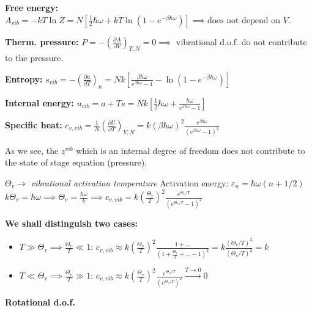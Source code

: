 \documentclass[12pt,a4paper]{report}
\newcommand{\esp}{\vspace{0.5cm}}
\begin{document}
	\esp
	
	\textbf{Free energy:}
	$A_{vib} = -kT \ln Z = N [ \frac{1}{2}\hbar\omega + kT \ln(1 - e^{-\beta\hbar\omega}) ] \implies \text{does not depend on } V$.
	
	\esp
	
	\textbf{Therm. pressure:}
	$P = -(\frac{\partial A}{\partial V})_{T,N} = 0 \implies$ vibrational d.o.f. do not contribute to the pressure.
	
	\esp
	
	\textbf{Entropy:}
	$s_{vib} = -(\frac{\partial a}{\partial T})_n = Nk \left[ \frac{\beta\hbar\omega}{e^{\beta\hbar\omega}-1} - \ln(1 - e^{-\beta\hbar\omega}) \right]$
	
	\esp
	
	\textbf{Internal energy:}
	$u_{vib} = a + Ts = Nk \left[ \frac{1}{2}\hbar\omega + \frac{\hbar\omega}{e^{\beta\hbar\omega}-1} \right]$
	
	\esp
	
	\textbf{Specific heat:}
	$c_{v,vib} = \frac{1}{N} (\frac{\partial U}{\partial T})_{V,N} = k (\beta\hbar\omega)^2 \frac{e^{\beta\hbar\omega}}{(e^{\beta\hbar\omega}-1)^2}$
	
	\esp
	
	As we see, the $z^{vib}$ which is an internal degree of freedom does not contribute to the state of stage equation (pressure).
	
	\esp
	
	$\Theta_v \rightarrow$ \textit{vibrational activation temperature}
	Activation energy: $\varepsilon_n = \hbar\omega(n + 1/2)$
	$k \Theta_v = \hbar\omega \implies \Theta_v = \frac{\hbar\omega}{k} \implies c_{v,vib} = k (\frac{\Theta_v}{T})^2 \frac{e^{\Theta_v/T}}{(e^{\Theta_v/T}-1)^2}$
	
	\esp
	
	\textbf{We shall distinguish two cases:}
	\begin{itemize}
		\item $T \gg \Theta_v \implies \frac{\Theta_v}{T} \ll 1$:
		$c_{v,vib} \approx k (\frac{\Theta_v}{T})^2 \frac{1 + \dots}{(1 + \frac{\Theta_v}{T} + \dots - 1)^2} = k \frac{(\Theta_v/T)^2}{(\Theta_v/T)^2} = k$
		\item $T \ll \Theta_v \implies \frac{\Theta_v}{T} \gg 1$:
		$c_{v,vib} \approx k (\frac{\Theta_v}{T})^2 \frac{e^{\Theta_v/T}}{(e^{\Theta_v/T})^2} \xrightarrow{T \to 0} 0$
	\end{itemize}
	
	\esp
	
	\textbf{Rotational d.o.f.}
	
\end{document}
